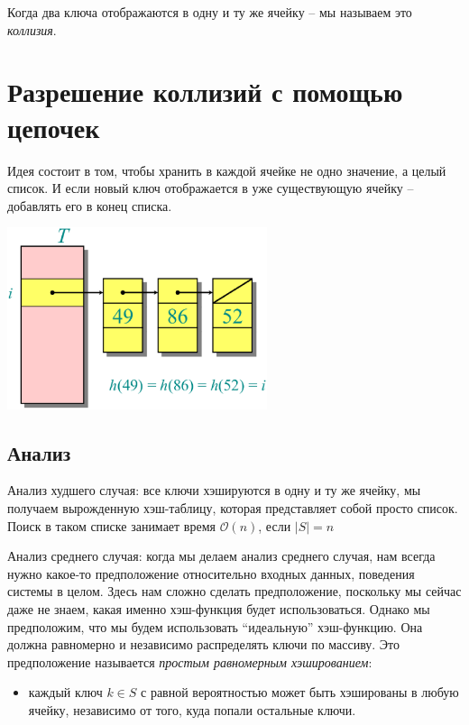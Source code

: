 \documentclass[a4paper,11pt]{article}
\begin{document}
Когда два ключа отображаются в одну и ту же ячейку -- мы называем это
\emph{коллизия}.

\section{Разрешение коллизий с помощью цепочек}

Идея состоит в том, чтобы хранить в каждой ячейке не одно значение, а целый
список. И если новый ключ отображается в уже существующую ячейку -- добавлять
его в конец списка.

\begin{center}
\includegraphics[width=3in]{lecture7/chaining.eps}
\end{center}

\subsection{Анализ}

Анализ худшего случая: все ключи хэшируются в одну и ту же ячейку, мы получаем
вырожденную хэш-таблицу, которая представляет собой просто список. Поиск в
таком списке занимает время $\mathcal{O}(n)$, если $|S| = n$

Анализ среднего случая: когда мы делаем анализ среднего случая, нам всегда нужно
какое-то предположение относительно входных данных, поведения системы в целом.
Здесь нам сложно сделать предположение, поскольку мы сейчас даже не знаем, какая
именно хэш-функция будет использоваться. Однако мы предположим, что мы будем
использовать ``идеальную'' хэш-функцию. Она должна равномерно и независимо
распределять ключи по массиву. Это предположение называется \emph{простым
равномерным хэшированием}:

\begin{itemize}
\item каждый ключ $k \in S$ с равной вероятностью может быть хэшированы в любую ячейку,
  независимо от того, куда попали остальные ключи.
\end{itemize}
\end{document}
